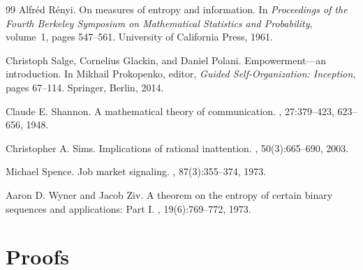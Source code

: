 \documentclass[11pt,a4paper]{article}
\theoremstyle{definition}
\newcommand{\1}{\mathbf 1}
\begin{document}
\begin{thebibliography}{99}
Alfr\'ed R\'enyi.
\newblock On measures of entropy and information.
\newblock In {\em Proceedings of the Fourth Berkeley Symposium on Mathematical Statistics and Probability}, volume~1,
  pages 547--561. University of California Press, 1961.

Christoph Salge, Cornelius Glackin, and Daniel Polani.
\newblock Empowerment---an introduction.
\newblock In Mikhail Prokopenko, editor, {\em Guided Self-Organization: Inception}, pages 67--114. Springer, Berlin,
  2014.

Claude E. Shannon.
\newblock A mathematical theory of communication.
, 27:379--423, 623--656, 1948.

Christopher A. Sims.
\newblock Implications of rational inattention.
, 50(3):665--690, 2003.

Michael Spence.
\newblock Job market signaling.
, 87(3):355--374, 1973.

Aaron D. Wyner and Jacob Ziv.
\newblock A theorem on the entropy of certain binary sequences and applications: Part {I}.
, 19(6):769--772, 1973.

\end{thebibliography}

\clearpage
\appendix

\part*{Proofs}


\clearpage

\clearpage

\end{document}
